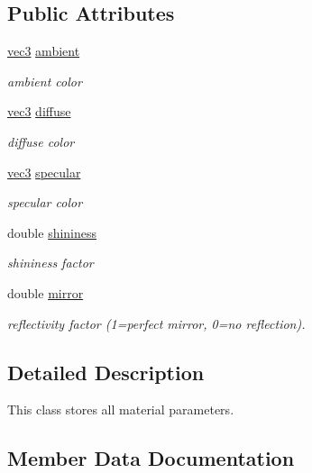 \subsection*{Public Attributes}
\begin{DoxyCompactItemize}
\item 
\hyperlink{classvec3}{vec3} \hyperlink{structMaterial_a7b24ee4bc74363181053123fd99e180c}{ambient}
\begin{DoxyCompactList}\small\item\em ambient color \end{DoxyCompactList}\item 
\hyperlink{classvec3}{vec3} \hyperlink{structMaterial_a17ee727d124d7a47afd6038e09fe76dd}{diffuse}
\begin{DoxyCompactList}\small\item\em diffuse color \end{DoxyCompactList}\item 
\hyperlink{classvec3}{vec3} \hyperlink{structMaterial_ab98526482184fa4cab89a33f6c13d033}{specular}
\begin{DoxyCompactList}\small\item\em specular color \end{DoxyCompactList}\item 
double \hyperlink{structMaterial_a3ebd453f91d79ab97ec25632d3ba5959}{shininess}
\begin{DoxyCompactList}\small\item\em shininess factor \end{DoxyCompactList}\item 
double \hyperlink{structMaterial_a0dbe6293086abea5d497ec9000ab9f0a}{mirror}
\begin{DoxyCompactList}\small\item\em reflectivity factor (1=perfect mirror, 0=no reflection). \end{DoxyCompactList}\end{DoxyCompactItemize}


\subsection{Detailed Description}
This class stores all material parameters. 

\subsection{Member Data Documentation}
